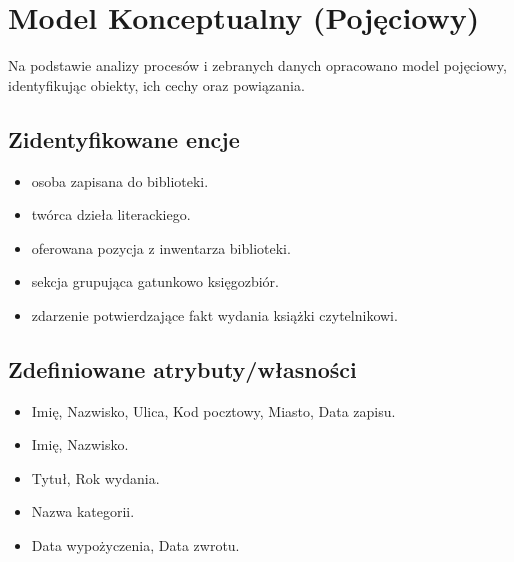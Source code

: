 \documentclass[letterpaper,10pt,english]{sphinxmanual}
\begin{document}
\section{Model Konceptualny (Pojęciowy)}
\label{\detokenize{rozdzial_3/index:model-konceptualny-pojeciowy}}
\sphinxAtStartPar
Na podstawie analizy procesów i zebranych danych opracowano model pojęciowy, identyfikując obiekty, ich cechy oraz powiązania.


\subsection{Zidentyfikowane encje}
\label{\detokenize{rozdzial_3/index:zidentyfikowane-encje}}\begin{itemize}
\item {} 
\sphinxAtStartPar
{} \sphinxhyphen{} osoba zapisana do biblioteki.

\item {} 
\sphinxAtStartPar
{} \sphinxhyphen{} twórca dzieła literackiego.

\item {} 
\sphinxAtStartPar
{} \sphinxhyphen{} oferowana pozycja z inwentarza biblioteki.

\item {} 
\sphinxAtStartPar
{} \sphinxhyphen{} sekcja grupująca gatunkowo księgozbiór.

\item {} 
\sphinxAtStartPar
{} \sphinxhyphen{} zdarzenie potwierdzające fakt wydania książki czytelnikowi.

\end{itemize}


\subsection{Zdefiniowane atrybuty/własności}
\label{\detokenize{rozdzial_3/index:zdefiniowane-atrybuty-wlasnosci}}\begin{itemize}
\item {} 
\sphinxAtStartPar
{} Imię, Nazwisko, Ulica, Kod pocztowy, Miasto, Data zapisu.

\item {} 
\sphinxAtStartPar
{} Imię, Nazwisko.

\item {} 
\sphinxAtStartPar
{} Tytuł, Rok wydania.

\item {} 
\sphinxAtStartPar
{} Nazwa kategorii.

\item {} 
\sphinxAtStartPar
{} Data wypożyczenia, Data zwrotu.

\end{itemize}
\end{document}
